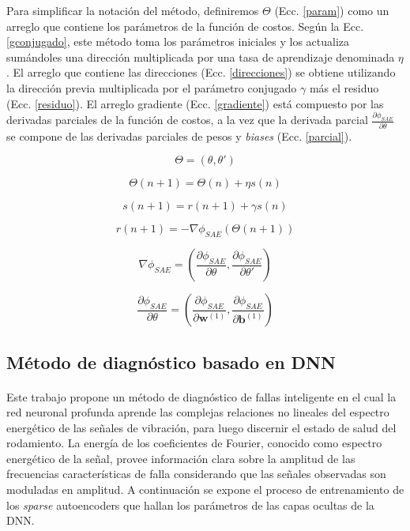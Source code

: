 \documentclass[12pt]{article}%
\begin{document}
Para simplificar la notación del método, definiremos $\Theta$ (Ecc. \ref{param}) como un arreglo que contiene los parámetros de la función de costos. Según la Ecc. \ref{gconjugado}, este método toma los parámetros iniciales y los actualiza sumándoles una dirección multiplicada por una tasa de aprendizaje denominada $\eta$. El arreglo que contiene las direcciones (Ecc. \ref{direcciones}) se obtiene utilizando la dirección previa multiplicada por el parámetro conjugado $\gamma$ más el residuo (Ecc. \ref{residuo}). El arreglo gradiente (Ecc. \ref{gradiente}) está compuesto por las derivadas parciales de la función de costos, a la vez que la derivada parcial $\frac{\partial{\phi_{SAE}}}{\partial{\theta}}$ se compone de las derivadas parciales de pesos y \textit{biases} (Ecc. \ref{parcial}).

\begin{equation}
\label{param}
\Theta = (\theta,\theta')
\end{equation} 

\begin{equation}
\label{gconjugado}
\Theta(n+1)=\Theta(n)+{\eta}s(n)
\end{equation}

\begin{equation}
\label{direcciones}
s(n+1)=r(n+1)+\gamma{s(n)}
\end{equation} 

\begin{equation}
\label{residuo}
r(n+1) = -\nabla{\phi_{SAE}(\Theta(n+1))}
\end{equation} 

\begin{equation}
\label{gradiente}
\nabla{\phi_{SAE}} = \left(\frac{\partial{\phi_{SAE}}}{\partial{\theta}},\frac{\partial{\phi_{SAE}}}{\partial{\theta'}}\right)
\end{equation}

\begin{equation}
\label{parcial}
\frac{\partial{\phi_{SAE}}}{\partial{\theta}} = \left(\frac{\partial{\phi_{SAE}}}{\partial{\textbf{w}^{(1)}}},\frac{\partial{\phi_{SAE}}}{\partial{\textbf{b}^{(1)}}}\right)
\end{equation}  
\subsection{Método de diagnóstico basado en DNN}
\label{sec:training}
\paragraph{}
Este trabajo propone un método de diagnóstico de fallas inteligente en el cual la red neuronal profunda aprende las complejas relaciones no lineales del espectro energético de las señales de vibración, para luego discernir el estado de salud del rodamiento. La energía de los coeficientes de Fourier, conocido como espectro energético de la señal, provee información clara sobre la amplitud de las frecuencias características de falla considerando que las señales observadas son moduladas en amplitud. A continuación se expone el proceso de entrenamiento de los \textit{sparse} autoencoders que hallan los parámetros de las capas ocultas de la DNN.
 
\end{document}
